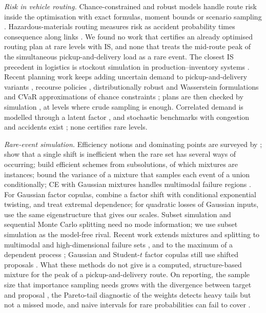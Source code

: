 \documentclass[ijoc,sglanonrev]{informs4}
\begin{document}
\emph{Risk in vehicle routing.} Chance-constrained and robust models
\citep{GounarisWiesemannFloudas2013,DinhFukasawaLuedtke2018,GhosalWiesemann2020}
handle route risk inside the optimisation with exact formulas, moment bounds or
scenario sampling \citep{GendreauJabaliRei2016}. Hazardous-materials routing
measures risk as accident probability times consequence along links
\citep{ErkutVerter1998}. We found no work that certifies an already optimised
routing plan at rare levels with IS, and none that treats the mid-route peak
of the simultaneous pickup-and-delivery load \citep{Dethloff2001} as a rare
event. The closest IS precedent in logistics is stockout simulation in
production--inventory systems \citep{GlassermanLiu1996}.
Recent planning work keeps adding uncertain demand to pickup-and-delivery
variants \citep{hu2025vehicle}, recourse policies \citep{salavati2019rulebased},
distributionally robust and Wasserstein formulations
\citep{yin2022distributionally,wang2023distributionally,Ghosal2024Unifying} and CVaR
approximations of chance constraints \citep{Zhang2021Vehicle,thiebaut2022approximating};
plans are then checked by simulation \citep{wang2025simulation}, at levels where
crude sampling is enough. Correlated demand is modelled through a latent factor
\citep{Florio2023Recent}, and stochastic benchmarks with congestion and accidents
exist \citep{Heakl2025SVRPBench}; none certifies rare levels.

\emph{Rare-event simulation.} Efficiency notions and dominating points are
surveyed by \citet{AsmussenGlynn2007}; \citet{GlassermanWang1997} show that a
single shift is inefficient when the rare set has several ways of occurring;
\citet{DupuisWang2007} build efficient schemes from subsolutions, of which
mixtures are instances; \citet{OwenMaximovChertkov2019} bound the variance of a
mixture that samples each event of a union conditionally; CE with Gaussian
mixtures handles multimodal failure regions
\citep{KurtzSong2013,GeyerPapaioannouStraub2019,PapaioannouGeyerStraub2019}.
For Gaussian factor copulas, \citet{GlassermanLi2005} combine a factor shift
with conditional exponential twisting, and \citet{BassambooJunejaZeevi2008}
treat extremal dependence; for quadratic losses of Gaussian inputs,
\citet{GlassermanHeidelbergerShahabuddin2000} use the same eigenstructure that
gives our scales. Subset simulation \citep{AuBeck2001} and sequential Monte
Carlo splitting \citep{CerouDelMoralFuronGuyader2012} need no mode
information; we use subset simulation as the model-free rival. Recent work extends mixtures and splitting to multimodal and high-dimensional
failure sets \citep{Helal2026Multimodal,Zhang2026GMM},
and to the maximum of a dependent process \citep{Conroy2022Maxima}; Gaussian
and Student-$t$ factor copulas still use shifted proposals \citep{Fang2026ISCOS}.
What these methods do not give is a computed, structure-based mixture for the peak
of a pickup-and-delivery route. On reporting, the sample size that importance
sampling needs grows with the divergence between target and proposal
\citep{Chatterjee2018Sample}, the Pareto-tail diagnostic of the weights
\citep{Vehtari2024PSIS} detects heavy tails but not a missed mode, and naive
intervals for rare probabilities can fail to cover \citep{Bai2024Uncertainty}.
\end{document}
